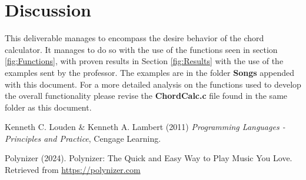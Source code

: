 \documentclass{article}
\begin{document}
\section{Discussion}
This deliverable manages to encompass the desire behavior of the chord calculator. It manages to do so with the use of the functions seen in section \ref{fig:Functions}, with proven results in Section \ref{fig:Results} with the use of the examples sent by the professor. The examples are in the folder \textbf{Songs} appended with this document. For a more detailed analysis on the functions used to develop the overall functionality please revise the \textbf{ChordCalc.c} file found in the same folder as this document.

\begin{thebibliography}{9}
    Kenneth C. Louden \& Kenneth A. Lambert (2011) \emph{Programming Languages - Principles and Practice}, Cengage Learning.
    
    Polynizer (2024). Polynizer: The Quick and Easy Way to Play Music You Love. Retrieved from \url{https://polynizer.com}
\end{thebibliography}
\end{document}
